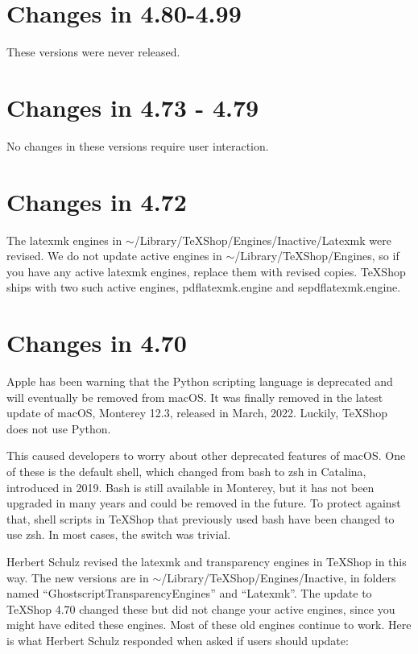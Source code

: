 \documentclass[11pt, oneside]{amsart}
\begin{document}
\section{Changes in 4.80-4.99}

These versions were never released.

\section{Changes in 4.73 - 4.79}

No changes in these versions require user interaction. 

\section{Changes in 4.72}

The latexmk engines in $\sim$/Library/TeXShop/Engines/Inactive/Latexmk were revised. We do not update active engines in $\sim$/Library/TeXShop/Engines, so if you have any active latexmk engines, replace them with revised copies. TeXShop ships with two such active engines, pdflatexmk.engine and sepdflatexmk.engine.

\section{Changes in 4.70}
Apple has been warning that the Python scripting language is deprecated and will eventually be removed from macOS.
It was finally removed in the latest update of macOS, Monterey 12.3, released in March, 2022. Luckily, TeXShop does not use Python. 

This caused developers to worry about other deprecated features of macOS. One of these is the default shell, which changed from bash to zsh in Catalina, introduced in 2019. Bash is still available in Monterey, but it has not been upgraded in many years and could be removed in the future. To protect against that, shell scripts in TeXShop that previously used bash have been changed to use zsh. In most cases, the switch was trivial.

Herbert Schulz revised the latexmk and transparency engines in TeXShop in this way. The new versions are in
$\sim$/Library/TeXShop/Engines/Inactive, in folders named ``GhostscriptTransparencyEngines'' and ``Latexmk''. The update to TeXShop 4.70 changed these but did not change your active engines, since you might have edited these engines. Most of these old engines  continue to work. Here is what Herbert Schulz responded when asked if users should update:
\end{document}

